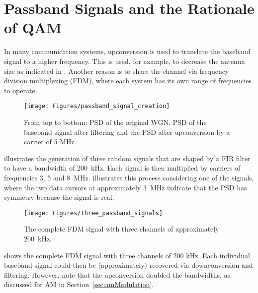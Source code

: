 \section{Passband Signals and the Rationale of QAM}



In many communication systems, upconversion is used to translate the baseband signal to a higher frequency. This is used, for example, to decrease the antenna size as indicated in
. Another reason is to share the channel via frequency division multiplexing (FDM), where each system has its own range of frequencies to operate.

\begin{figure}[htbp]
\centering
\texttt{[image: Figures/passband\_signal\_creation]}
\caption{From top to bottom: PSD of the original WGN, PSD of the baseband signal after filtering and the PSD after upconversion by a carrier of 5 MHz.\label{fig:passband_signal_creation}}
\end{figure}

 illustrates the generation of three random signals that are shaped by a FIR filter to have a bandwidth of 200~kHz. Each signal is then multiplied by carriers of frequencies 3, 5 and 8~MHz.  illustrates this process considering one of the signals, where the two data cursors at approximately 3~MHz indicate that the PSD has symmetry because the signal is real.


\begin{figure}[htbp]
\centering
\texttt{[image: Figures/three\_passband\_signals]}
\caption{The complete FDM signal with three channels of approximately 200~kHz.\label{fig:three_passband_signals}}
\end{figure}

 shows the complete FDM signal with three channels of 200 kHz. Each individual baseband signal could then be (approximately) recovered via downconversion and filtering. However, note that the upconversion doubled the bandwidths, as discussed for AM in Section~\ref{sec:amModulation}. 

